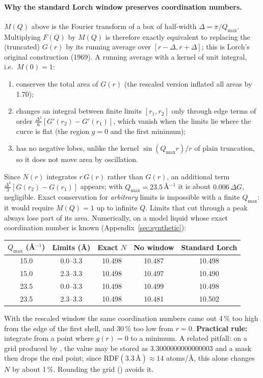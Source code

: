 \documentclass[11pt,a4paper]{article}
\begin{document}
\paragraph{Why the standard Lorch window preserves coordination numbers.}
$M(Q)$ above is the Fourier transform of a box of half-width
$\Delta = \pi/Q_\mathrm{max}$. Multiplying $F(Q)$ by $M(Q)$ is therefore
exactly equivalent to replacing the (truncated) $G(r)$ by its running
average over $[r-\Delta, r+\Delta]$; this is Lorch's original construction
(1969). A running average with a kernel of unit integral, i.e.\ $M(0)=1$:
\begin{enumerate}
  \item conserves the total area of $G(r)$ (the rescaled version inflated
    all areas by 1.70);
  \item changes an integral between finite limits $[r_1, r_2]$ only through
    edge terms of order $\frac{\Delta^2}{6}[G'(r_2) - G'(r_1)]$, which vanish
    when the limits lie where the curve is flat (the region $g=0$ and the
    first minimum);
  \item has no negative lobes, unlike the kernel $\sin(Q_\mathrm{max} r)/r$
    of plain truncation, so it does not move area by oscillation.
\end{enumerate}
Since $N(r)$ integrates $r\,G(r)$ rather than $G(r)$, an additional term
$\frac{\Delta^2}{3}[G(r_2)-G(r_1)]$ appears; with $Q_\mathrm{max}=23.5$\,\AA$^{-1}$
it is about $0.006\,\Delta G$, negligible. Exact conservation for
\emph{arbitrary} limits is impossible with a finite $Q_\mathrm{max}$: it
would require $M(Q)=1$ up to infinite $Q$. Limits that cut through a peak
always lose part of its area. Numerically, on a model liquid whose exact
coordination number is known (Appendix~\ref{sec:synthetic}):

\begin{center}
\begin{tabular}{@{}c c c c c@{}}
\toprule
$Q_\mathrm{max}$ (\AA$^{-1}$) & Limits (\AA) & Exact $N$ & No window & Standard Lorch \\
\midrule
15.0 & 0.0--3.3 & 10.498 & 10.487 & 10.498 \\
15.0 & 2.3--3.3 & 10.498 & 10.497 & 10.490 \\
23.5 & 0.0--3.3 & 10.498 & 10.499 & 10.498 \\
23.5 & 2.3--3.3 & 10.498 & 10.481 & 10.502 \\
\bottomrule
\end{tabular}
\end{center}
With the rescaled window the same coordination numbers came out 4\,\% too
high from the edge of the first shell, and 30\,\% too low from $r=0$.
\textbf{Practical rule:} integrate from a point where $g(r)=0$ to a
minimum. A related pitfall: on a grid produced by , the
value  may be stored as 3.3000000000000003 and a mask
 then drops the end point; since RDF$(3.3\,\text{\AA})\approx 14$
atoms/\AA, this alone changes $N$ by about 1\,\%. Rounding the grid
() avoids it.
\end{document}
